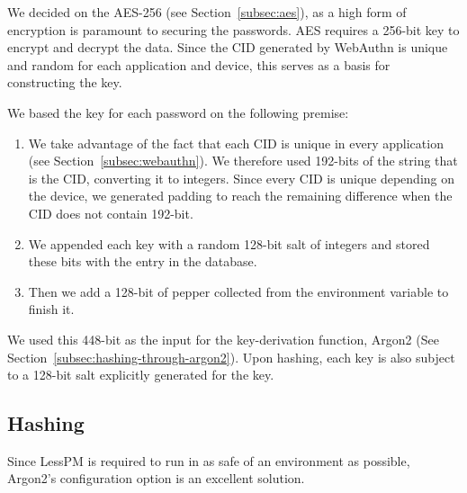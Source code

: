 We decided on the AES-256 (see Section~\ref{subsec:aes}), as a high form of
encryption is paramount to securing the passwords.
AES requires a 256-bit key to encrypt and decrypt the data.
Since the CID generated by WebAuthn is unique and random for each application
and device, this serves as a basis for constructing the key.

We based the key for each password on the following premise:
\begin{enumerate}
  \item
  We take advantage of the fact that each CID is unique in every application
  (see Section~\ref{subsec:webauthn}).
  We therefore used 192-bits of the string that is the CID\@, converting it to
  integers.
  Since every CID is unique depending on the device, we generated padding to
  reach the remaining difference when the CID does not contain 192-bit.
  \item
  We appended each key with a random 128-bit salt of integers and stored these
  bits with the entry in the database.
  \item
  Then we add a 128-bit of pepper collected from the environment variable to
  finish it.
\end{enumerate}
We used this 448-bit as the input for the key-derivation function,
Argon2 (See Section~\ref{subsec:hashing-through-argon2}).
Upon hashing, each key is also subject to a 128-bit salt explicitly generated
for the key.

\subsection{Hashing}\label{subsec:hashing}

Since LessPM is required to run in as safe of an environment as possible,
Argon2's configuration option is an excellent solution.


